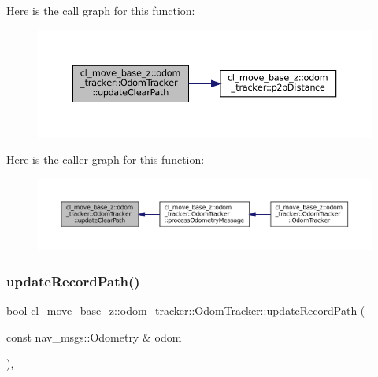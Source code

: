 Here is the call graph for this function\+:
\nopagebreak
\begin{figure}[H]
\begin{center}
\leavevmode
\includegraphics[width=350pt]{classcl__move__base__z_1_1odom__tracker_1_1OdomTracker_abe7ba4dbf014e1f2c64b5806ce42c073_cgraph}
\end{center}
\end{figure}
Here is the caller graph for this function\+:
\nopagebreak
\begin{figure}[H]
\begin{center}
\leavevmode
\includegraphics[width=350pt]{classcl__move__base__z_1_1odom__tracker_1_1OdomTracker_abe7ba4dbf014e1f2c64b5806ce42c073_icgraph}
\end{center}
\end{figure}
\mbox{\label{classcl__move__base__z_1_1odom__tracker_1_1OdomTracker_a77a66083573c6bef726d77447fb53349}} 
\subsubsection{\texorpdfstring{update\+Record\+Path()}{updateRecordPath()}}
{\footnotesize\ttfamily \hyperlink{classbool}{bool} cl\+\_\+move\+\_\+base\+\_\+z\+::odom\+\_\+tracker\+::\+Odom\+Tracker\+::update\+Record\+Path (\begin{DoxyParamCaption}\item[{const nav\+\_\+msgs\+::\+Odometry \&}]{odom }\end{DoxyParamCaption})\hspace{0.3cm}{\ttfamily [protected]}, {\ttfamily [virtual]}}


